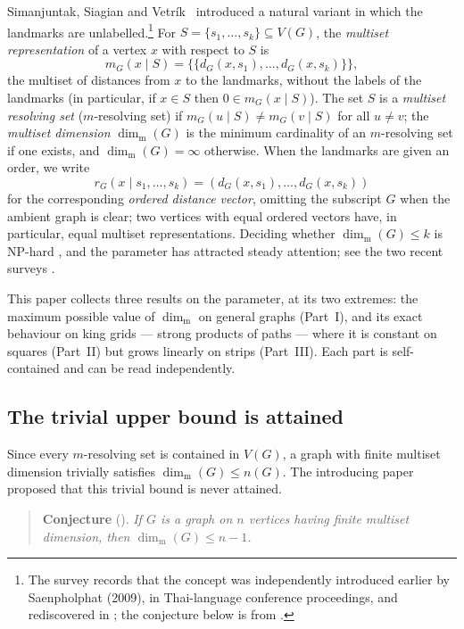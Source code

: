 \documentclass[11pt]{amsart}
\theoremstyle{remark}
\newcommand{\mdim}{\operatorname{dim}_{\mathrm m}}
\newcommand{\dist}{d}
\newcommand{\ms}[1]{\mathopen{\{\!\{}#1\mathclose{\}\!\}}}
\begin{document}
Simanjuntak, Siagian and Vetr\'ik~\cite{SimanjuntakEtAl} introduced a natural variant in which the landmarks are unlabelled.\footnote{The survey \cite{FarhanEtAl2026} records that the concept was independently introduced earlier by Saenpholphat (2009), in Thai-language conference proceedings, and rediscovered in \cite{SimanjuntakEtAl}; the conjecture below is from \cite{SimanjuntakEtAl}.}  For $S=\{s_1,\dots,s_k\}\subseteq V(G)$, the \emph{multiset representation} of a vertex $x$ with respect to $S$ is
\[
 m_G(x\mid S)=\ms{\dist_G(x,s_1),\dots,\dist_G(x,s_k)},
\]
the multiset of distances from $x$ to the landmarks, without the labels of the landmarks (in particular, if $x\in S$ then $0\in m_G(x\mid S)$).  The set $S$ is a \emph{multiset resolving set} ($m$-resolving set) if $m_G(u\mid S)\ne m_G(v\mid S)$ for all $u\ne v$; the \emph{multiset dimension} $\mdim(G)$ is the minimum cardinality of an $m$-resolving set if one exists, and $\mdim(G)=\infty$ otherwise.  When the landmarks are given an order, we write
\[
 r_G(x\mid s_1,\dots,s_k)=(\dist_G(x,s_1),\dots,\dist_G(x,s_k))
\]
for the corresponding \emph{ordered distance vector}, omitting the subscript $G$ when the ambient graph is clear; two vertices with equal ordered vectors have, in particular, equal multiset representations.  Deciding whether $\mdim(G)\leq k$ is NP-hard \cite{HakanenYero2024}, and the parameter has attracted steady attention; see the two recent surveys \cite{FarhanEtAl2026,AlbejaniEtAl2026}.

This paper collects three results on the parameter, at its two extremes: the maximum possible value of $\mdim$ on general graphs (Part~I), and its exact behaviour on king grids --- strong products of paths --- where it is constant on squares (Part~II) but grows linearly on strips (Part~III).  Each part is self-contained and can be read independently.

\subsection{The trivial upper bound is attained}

Since every $m$-resolving set is contained in $V(G)$, a graph with finite multiset dimension trivially satisfies $\mdim(G)\le n(G)$.  The introducing paper proposed that this trivial bound is never attained.

\begin{quote}
\textbf{Conjecture} (\cite[Conjecture~2.1]{SimanjuntakEtAl}).  \emph{If $G$ is a graph on $n$ vertices having finite multiset dimension, then $\mdim(G)\le n-1$.}
\end{quote}
\end{document}
